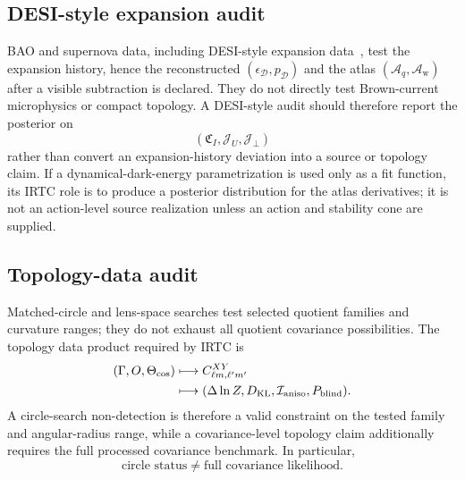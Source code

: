 \documentclass[
  aps,
  prd,
  reprint,
  superscriptaddress,
  floatfix,
  nofootinbib,
  longbibliography
]{revtex4-2}
\theoremstyle{plain}
\theoremstyle{definition}
\theoremstyle{remark}
\newcommand{\D}{\mathcal D}
\newcommand{\Aq}{\mathcal A_q}
\newcommand{\Aw}{\mathcal A_{\mathrm w}}
\newcommand{\KL}{\operatorname{KL}}
\newcommand{\Ical}{\mathcal I}
\newcommand{\Jcal}{\mathcal J}
\begin{document}
\subsection{DESI-style expansion audit}

BAO and supernova data, including DESI-style expansion data~\cite{DESI2025DR2}, test the expansion history, hence the reconstructed \((\epsilon_\D,p_\D)\) and the atlas \((\Aq,\Aw)\) after a visible subtraction is declared.  They do not directly test Brown-current microphysics or compact topology.  A DESI-style audit should therefore report the posterior on
\begin{equation}
\left(
\mathfrak C_I,\Jcal_U,\Jcal_\perp
\right)
\end{equation}
rather than convert an expansion-history deviation into a source or topology claim.  If a dynamical-dark-energy parametrization is used only as a fit function, its IRTC role is to produce a posterior distribution for the atlas derivatives; it is not an action-level source realization unless an action and stability cone are supplied.

\subsection{Topology-data audit}

Matched-circle and lens-space searches test selected quotient families and curvature ranges; they do not exhaust all quotient covariance possibilities.  The topology data product required by IRTC is
\begin{equation}
\begin{aligned}
(\Gamma,O,\Theta_{\rm cos})
&\longmapsto C_{\ell m,\ell'm'}^{XY}\\
&\longmapsto
(\Delta\ln Z,D_{\KL},\Ical_{\rm aniso},P_{\rm blind}) .
\end{aligned}
\end{equation}
A circle-search non-detection is therefore a valid constraint on the tested family and angular-radius range, while a covariance-level topology claim additionally requires the full processed covariance benchmark.  In particular,
\begin{equation}
\boxed{
\text{circle status}\neq\text{full covariance likelihood}.
}
\end{equation}
\end{document}
